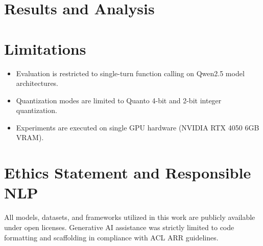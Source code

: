 \documentclass[11pt,a4paper]{article}
\begin{document}
\section{Results and Analysis}


\section{Limitations}
\begin{itemize}
    \item Evaluation is restricted to single-turn function calling on Qwen2.5 model architectures.
    \item Quantization modes are limited to Quanto 4-bit and 2-bit integer quantization.
    \item Experiments are executed on single GPU hardware (NVIDIA RTX 4050 6GB VRAM).
\end{itemize}

\section{Ethics Statement and Responsible NLP}
All models, datasets, and frameworks utilized in this work are publicly available under open licenses. Generative AI assistance was strictly limited to code formatting and scaffolding in compliance with ACL ARR guidelines.


\end{document}
